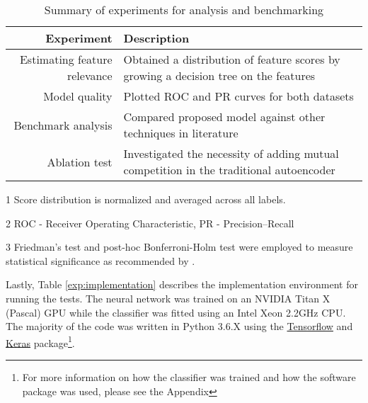 \begin{table}[!h]
  \centering
  \caption{Summary of experiments for analysis and benchmarking}
  \label{exp:key_results}
  \begin{threeparttable}
      \begin{tabular}{@{}rp{}@{}}
          \toprule
          Experiment                      & Description \\ \midrule
          Estimating feature relevance    & Obtained a distribution of feature scores by growing a decision tree on the features\tnote{1} \\
          Model quality         & Plotted ROC and PR curves for both
          datasets\tnote{2}\\
          Benchmark analysis     & Compared proposed model against other
          techniques in literature\tnote{3}\\
          Ablation test                   & Investigated the necessity of adding
          mutual competition in the traditional autoencoder\\\bottomrule
      \end{tabular}
  \begin{tablenotes}
      \footnotesize
      \item[1] Score distribution is normalized and averaged across all labels.
      \item[2] ROC - Receiver Operating Characteristic, PR - Precision--Recall
      \item[3] Friedman's test \parencite{friedman1937use} and post-hoc Bonferroni-Holm test \parencite{holm1979simple}
      were employed to measure statistical significance as recommended by \cite{demsar2006statistical}.
  \end{tablenotes}
  \end{threeparttable}
\end{table}

\par Lastly, Table \ref{exp:implementation} describes the implementation
environment for running the tests. The neural network was trained on an
NVIDIA Titan X (Pascal) GPU while the classifier was fitted using an Intel
Xeon 2.2GHz CPU. The majority of the code was written in Python 3.6.X using
the \href{https://www.tensorflow.org/}{Tensorflow} and
\href{https://keras.io/}{Keras} package\footnote{For more information on how
the classifier was trained and how the software package was used, please see
the Appendix}.


